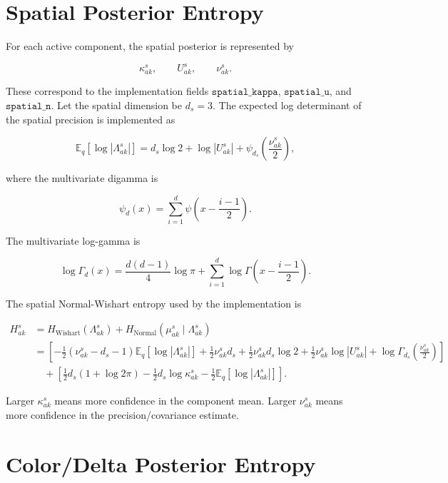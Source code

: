 \documentclass[11pt]{article}
\newcommand{\E}{\mathbb{E}}
\begin{document}
\section{Spatial Posterior Entropy}

For each active component, the spatial posterior is represented by

\[
  \kappa^s_{ak},
  \qquad
  U^s_{ak},
  \qquad
  \nu^s_{ak}.
\]

These correspond to the implementation fields
\(\texttt{spatial\_kappa}\), \(\texttt{spatial\_u}\), and
\(\texttt{spatial\_n}\). Let the spatial dimension be \(d_s = 3\). The expected
log determinant of the spatial precision is implemented as

\[
  \E_q[\log |\Lambda^s_{ak}|]
  =
  d_s \log 2
  +
  \log |U^s_{ak}|
  +
  \psi_{d_s}
  \left(
    \frac{\nu^s_{ak}}{2}
  \right),
\]

where the multivariate digamma is

\[
  \psi_d(x)
  =
  \sum_{i=1}^{d}
  \psi
  \left(
    x - \frac{i-1}{2}
  \right).
\]

The multivariate log-gamma is

\[
  \log \Gamma_d(x)
  =
  \frac{d(d-1)}{4}\log \pi
  +
  \sum_{i=1}^{d}
  \log \Gamma
  \left(
    x - \frac{i-1}{2}
  \right).
\]

The spatial Normal-Wishart entropy used by the implementation is

\[
\begin{aligned}
  H^s_{ak}
  &=
  H_{\mathrm{Wishart}}(\Lambda^s_{ak})
  +
  H_{\mathrm{Normal}}(\mu^s_{ak} \mid \Lambda^s_{ak}) \\
  &=
  \left[
    -\frac{1}{2}(\nu^s_{ak} - d_s - 1)
      \E_q[\log |\Lambda^s_{ak}|]
    + \frac{1}{2}\nu^s_{ak} d_s
    + \frac{1}{2}\nu^s_{ak} d_s \log 2
    + \frac{1}{2}\nu^s_{ak}\log |U^s_{ak}|
    + \log \Gamma_{d_s}
      \left(
        \frac{\nu^s_{ak}}{2}
      \right)
  \right] \\
  &\quad+
  \left[
    \frac{1}{2}d_s(1 + \log 2\pi)
    - \frac{1}{2}d_s\log \kappa^s_{ak}
    - \frac{1}{2}\E_q[\log |\Lambda^s_{ak}|]
  \right].
\end{aligned}
\]

Larger \(\kappa^s_{ak}\) means more confidence in the component mean. Larger
\(\nu^s_{ak}\) means more confidence in the precision/covariance estimate.

\section{Color/Delta Posterior Entropy}
\end{document}
